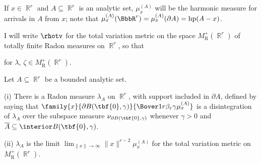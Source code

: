 If $x\in\BbbR^r$ and $A\subseteq\BbbR^r$ is an analytic set, $\mu_x^{(A)}$
will be the harmonic measure for arrivals in $A$ from $x$;
note that $\mu_x^{(A)}(\BbbR^r)=\mu_x^{(A)}(\partial A)=\hp(A-x)$.

I will write $\rhotv$ for the total variation metric on the space
$M^+_{\text{R}}(\BbbR^r)$ of totally finite Radon measures on $\BbbR^r$, so
that


\noindent for $\lambda$,
$\zeta\in M^+_{\text{R}}(\BbbR^r)$.

 Let $A\subseteq\BbbR^r$ be a bounded analytic set.

\quad(i) There is a Radon measure $\lambda_A$ on $\BbbR^r$, with support
included in $\partial A$, defined by saying that
\discretionary{}{}{}$\family{x}{\partial B(\tbf{0},\gamma)}
{\Bover1{r\beta_r\gamma}\mu_x^{(A)}}$ is a
disintegration of $\lambda_A$ over the subspace measure
$\nu_{\partial B(\tbf{0},\gamma)}$ whenever $\gamma>0$ and
$\overline{A}\subseteq\interior B(\tbf{0},\gamma)$.

\quad(ii) $\lambda_A$ is the limit
$\lim_{\|x\|\to\infty}\|x\|^{r-2}\mu_x^{(A)}$ for
the total variation metric on $M^+_{\text{R}}(\BbbR^r)$.


